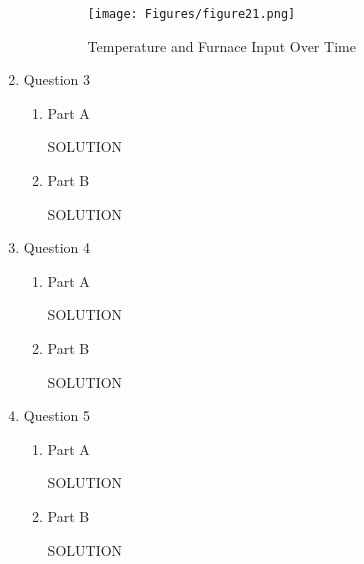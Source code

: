 \documentclass[12pt]{article}
\begin{document}
\begin{enumerate}
\begin{enumerate}
  \begin{figure}[h!]
    \centering
    \texttt{[image: Figures/figure21.png]}
    \caption{Temperature and Furnace Input Over Time}
    \label{fig:figure21} 
  \end{figure}

  \end{enumerate}
\newpage

\item Question 3
  \begin{enumerate}
  \item Part A  %

  SOLUTION

  \item Part B  %

  SOLUTION
  \end{enumerate}
\newpage

\item Question 4
  \begin{enumerate}
  \item Part A  %

  SOLUTION

  \item Part B  %

  SOLUTION
  \end{enumerate}
\newpage

\item Question 5
  \begin{enumerate}
  \item Part A  %

  SOLUTION

  \item Part B  %

  SOLUTION
  \end{enumerate}
\newpage

\end{enumerate}
\end{document}
